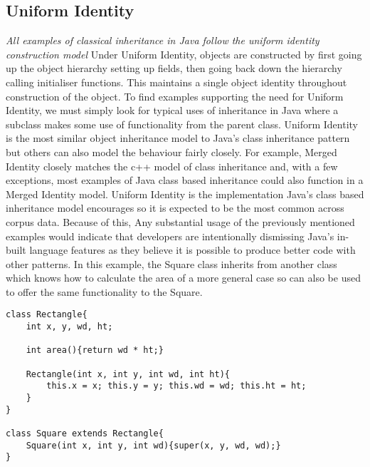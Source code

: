 \subsection{Uniform Identity}
\textit{All examples of classical inheritance in Java follow the uniform identity construction model}\newline\newline
Under Uniform Identity, objects are constructed by first going up the object hierarchy setting up fields, then going back down the hierarchy calling initialiser functions. This maintains a single object identity throughout construction of the object.\newline
To find examples supporting the need for Uniform Identity, we must simply look for typical uses of inheritance in Java where a subclass makes some use of functionality from the parent class. Uniform Identity is the most similar object inheritance model to Java’s class inheritance pattern but others can also model the behaviour fairly closely. For example, Merged Identity closely matches the c++ model of class inheritance and, with a few exceptions, most examples of Java class based inheritance could also function in a Merged Identity model. Uniform Identity is the implementation Java’s class based inheritance model encourages so it is expected to be the most common across corpus data. Because of this, Any substantial usage of the previously mentioned examples would indicate that developers are intentionally dismissing Java’s in-built language features as they believe it is possible to produce better code with other patterns.\newline
In this example, the Square class inherits from another class which knows how to calculate the area of a more general case so can also be used to offer the same functionality to the Square. 
\begin{lstlisting}
class Rectangle{
	int x, y, wd, ht;
	
	int area(){return wd * ht;}
	
	Rectangle(int x, int y, int wd, int ht){
		this.x = x; this.y = y; this.wd = wd; this.ht = ht;
	}
}

class Square extends Rectangle{
	Square(int x, int y, int wd){super(x, y, wd, wd);}
}
\end{lstlisting}


